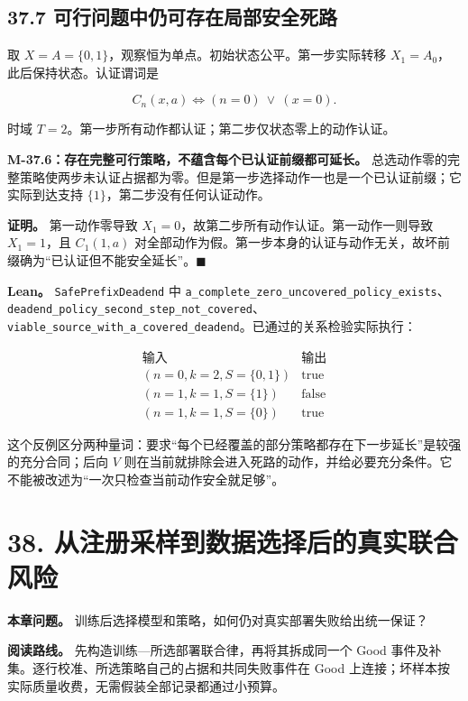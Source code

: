 \documentclass[
  11pt,
  oneside]{book}
\begin{document}
\section{37.7 可行问题中仍可存在局部安全死路}\label{ux53efux884cux95eeux9898ux4e2dux4ecdux53efux5b58ux5728ux5c40ux90e8ux5b89ux5168ux6b7bux8def}

取 \(X=A=\{0,1\}\)，观察恒为单点。初始状态公平。第一步实际转移 \(X_1=A_0\)，此后保持状态。认证谓词是

\[C_n(x,a)\iff(n=0)\ \lor\ (x=0).\]

时域 \(T=2\)。第一步所有动作都认证；第二步仅状态零上的动作认证。

\hypertarget{m-37-6}{}\label{m-37-6}

\textbf{M-37.6：存在完整可行策略，不蕴含每个已认证前缀都可延长。} 总选动作零的完整策略使两步未认证占据都为零。但是第一步选择动作一也是一个已认证前缀；它实际到达支持 \(\{1\}\)，第二步没有任何认证动作。

\textbf{证明。} 第一动作零导致 \(X_1=0\)，故第二步所有动作认证。第一动作一则导致 \(X_1=1\)，且 \(C_1(1,a)\) 对全部动作为假。第一步本身的认证与动作无关，故坏前缀确为``已认证但不能安全延长''。\(\blacksquare\)

\textbf{Lean。} \nolinkurl{SafePrefixDeadend} 中 \nolinkurl{a_complete_zero_uncovered_policy_exists}、\nolinkurl{deadend_policy_second_step_not_covered}、\nolinkurl{viable_source_with_a_covered_deadend}。已通过的关系检验实际执行：

\[\begin{array}{c|c}
\text{输入}&\text{输出}\\ \hline
(n=0,k=2,S=\{0,1\})&\mathrm{true}\\
(n=1,k=1,S=\{1\})&\mathrm{false}\\
(n=1,k=1,S=\{0\})&\mathrm{true}
\end{array}\]

这个反例区分两种量词：要求``每个已经覆盖的部分策略都存在下一步延长''是较强的充分合同；后向 \(V\) 则在当前就排除会进入死路的动作，并给必要充分条件。它不能被改述为``一次只检查当前动作安全就足够''。

\chapter{38. 从注册采样到数据选择后的真实联合风险}\label{ch-38}

\textbf{本章问题。} 训练后选择模型和策略，如何仍对真实部署失败给出统一保证？

\textbf{阅读路线。} 先构造训练---所选部署联合律，再将其拆成同一个 Good 事件及补集。逐行校准、所选策略自己的占据和共同失败事件在 Good 上连接；坏样本按实际质量收费，无需假装全部记录都通过小预算。
\end{document}
